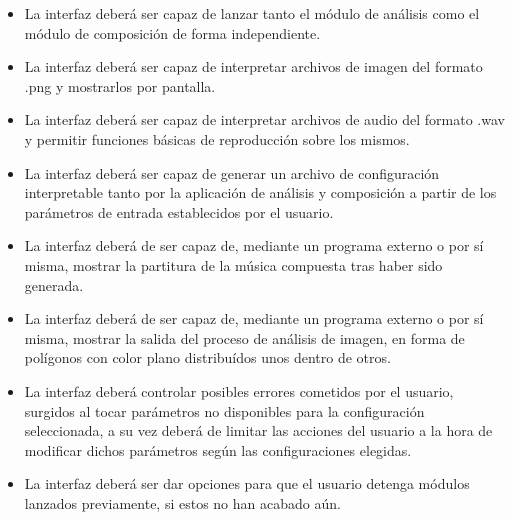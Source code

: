 	 \begin{itemize}
		 \item La interfaz deberá ser capaz de lanzar tanto el módulo de análisis como el módulo de composición de forma independiente.
		 \item La interfaz deberá ser capaz de interpretar archivos de imagen del formato .png y mostrarlos por pantalla.
		 \item La interfaz deberá ser capaz de interpretar archivos de audio del formato .wav y permitir funciones básicas de reproducción sobre los mismos.
		 \item La interfaz deberá ser capaz de generar un archivo de configuración interpretable tanto por la aplicación de análisis y composición a partir de los parámetros de entrada establecidos por el usuario.
		 \item La interfaz deberá de ser capaz de, mediante un programa externo o por sí misma, mostrar la partitura de la música compuesta tras haber sido generada.
		 \item La interfaz deberá de ser capaz de, mediante un programa externo o por sí misma, mostrar la salida del proceso de análisis de imagen, en forma de polígonos con color plano distribuídos unos dentro de otros.
		 \item La interfaz deberá controlar posibles errores cometidos por el usuario, surgidos al tocar parámetros no disponibles para la configuración seleccionada, a su vez deberá de limitar las acciones del usuario a la hora de modificar dichos parámetros según las configuraciones elegidas.
		 \item La interfaz deberá ser dar opciones para que el usuario detenga módulos lanzados previamente, si estos no han acabado aún.
	 \end{itemize}
 
